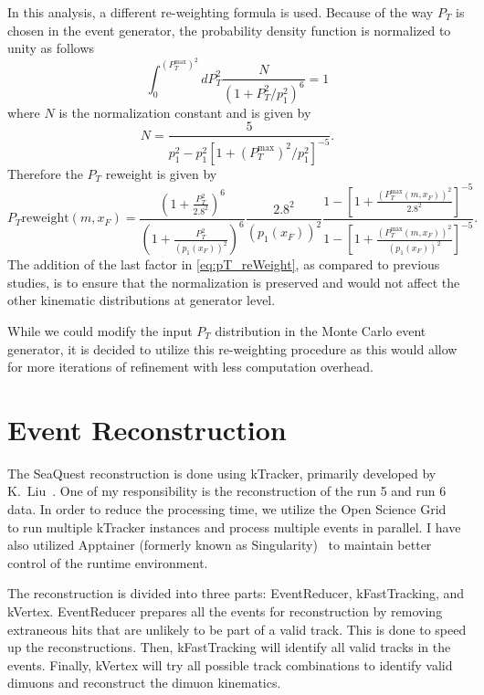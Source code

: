 \documentclass[../main.tex]{subfiles}
\begin{document}
In this analysis, a different re-weighting formula is used. Because of the way $P_T$ is chosen
in the event generator, the probability density function is normalized to unity as follows
\begin{equation}
	\int^{\left(P_T^{\mathrm{max}}\right)^2}_0 dP_T^2 \frac{N}{\left(1+ P_T^2/p_1^2\right)^6}=1
\end{equation}
where $N$ is the normalization constant and is given by
\begin{equation}
	N=\frac{5}{p_1^2-p_1^2\left[ 1+ \left(P_T^{\mathrm{max}}\right)^2/p_1^2\right]^{-5}}.
\end{equation}
Therefore the $P_T$ reweight is given by
\begin{equation}
	P_T \mathrm{ reweight}\left(m,x_F\right)=
	\frac{\left(1 + \frac{P_T^2}{2.8^2} \right)^6}{\left(1 + \frac{P_T^2}{\left(p_1\left(x_F\right)\right)^2} \right)^6} \frac{2.8^2}{\left(p_1\left(x_F\right)\right)^2}\frac{1-\left[ 1+ \frac{\left(P_T^{\mathrm{max}}\left(m,x_F\right)\right)^2}{2.8^2}\right]^{-5}}{1-\left[ 1+ \frac{\left(P_T^{\mathrm{max}}\left(m,x_F\right)\right)^2}{\left(p_1\left(x_F\right)\right)^2}\right]^{-5}}.
	\label{eq:pT_reWeight}
\end{equation}
The addition of the last factor in \cref{eq:pT_reWeight}, as compared to previous studies,
is to ensure that the normalization is preserved and would not affect the other kinematic
distributions at generator level.

While we could modify the input $P_T$ distribution in the Monte Carlo event generator,
it is decided to utilize this re-weighting procedure as this would allow for
more iterations of refinement with less computation overhead.

\section{Event Reconstruction}
The SeaQuest reconstruction is done using kTracker, primarily developed by K.~Liu~\cite{kTracker}.
One of my responsibility is the reconstruction of the run 5 and run 6 data. In order to reduce the processing
time, we utilize the Open Science Grid~\cite{pordes2007,sfiligoi2009,osg2006} to run multiple kTracker
instances and process multiple events in parallel.
I have also utilized Apptainer (formerly known as Singularity)~\cite{kurtzer2021} to maintain better control of the
runtime environment.

The reconstruction is divided into three parts: EventReducer, kFastTracking, and kVertex.
EventReducer prepares all the events for reconstruction by removing extraneous hits that are
unlikely to be part of a valid track. This is done to speed up the reconstructions. Then, kFastTracking
will identify all valid tracks in the events. Finally, kVertex will try all possible track combinations
to identify valid dimuons and reconstruct the dimuon kinematics.
\end{document}
